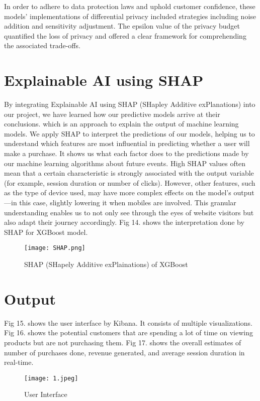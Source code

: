 \documentclass[conference]{IEEEtran}
\begin{document}
In order to adhere to data protection laws and uphold customer confidence, these models' implementations of differential privacy included strategies including noise addition and sensitivity adjustment. The epsilon value of the privacy budget quantified the loss of privacy and offered a clear framework for comprehending the associated trade-offs.






\section*{Explainable AI using SHAP}

By integrating Explainable AI using SHAP (SHapley Additive exPlanations) into our project, we have learned how our predictive models arrive at their conclusions. which is an approach to explain the output of machine learning models. We apply SHAP to interpret the predictions of our models, helping us to understand which features are most influential in predicting whether a user will make a purchase. It shows us what each factor does to the predictions made by our machine learning algorithms about future events. High SHAP values often mean that a certain characteristic is strongly associated with the output variable (for example, session duration or number of clicks). However, other features, such as the type of device used, may have more complex effects on the model's output—in this case, slightly lowering it when mobiles are involved. This granular understanding enables us to not only see through the eyes of website visitors but also adapt their journey accordingly. Fig 14. shows the interpretation done by SHAP for XGBoost model.

\begin{figure}[htbp]
\centerline{\texttt{[image: SHAP.png]}}
\caption{SHAP (SHapely Additive exPlainations) of XGBoost}
\label{fig}
\end{figure}

\section{Output}
Fig 15. shows the user interface by Kibana. It consists of multiple visualizations. Fig 16. shows the potential customers that are spending a lot of time on viewing products but are not purchasing them. Fig 17. shows the overall estimates of number of purchases done, revenue generated, and average session duration in real-time.
\begin{figure}[htbp]
\centerline{\texttt{[image: 1.jpeg]}}
\caption{User Interface}
\label{fig}
\end{figure}
\end{document}
